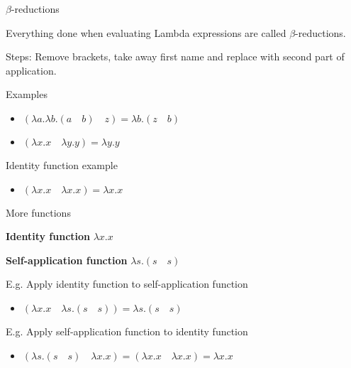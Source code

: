 \documentclass{beamer}
\begin{document}
\begin{frame}{$\beta$-reductions}

Everything done when evaluating Lambda expressions are called $\beta$-reductions.

\vspace{0.5cm}

Steps: Remove brackets, take away first name and replace with second part of application.

\vspace{0.5cm}

\begin{block}{Examples}
  \begin{itemize}
  	\item $(\lambda a . \lambda b . (a \quad b) \quad z) = \lambda b . (z \quad b)$
   	\item $(\lambda x . x \quad \lambda y . y) = \lambda y . y$
  \end{itemize}
\end{block}

\begin{block}{Identity function example}
  \begin{itemize}
    \item $(\lambda x . x \quad \lambda x . x) = \lambda x . x$
  \end{itemize}
\end{block}

\end{frame}

\begin{frame}{More functions}
	\begin{framed}
    	\textbf{Identity function} \hfill $\lambda x . x$
    \end{framed}
    	\begin{framed}
    	\textbf{Self-application function} \hfill $\lambda s . (s \quad s)$
    \end{framed}
    \begin{block}{E.g. Apply identity function to self-application function}
	    \begin{itemize}
    		\item $(\lambda x . x \quad \lambda s . (s \quad s)) = \lambda s. (s \quad s)$
	    \end{itemize}
    \end{block}
    \begin{block}{E.g. Apply self-application function to identity function}
	    \begin{itemize}
    		\item $(\lambda s . (s \quad s) \quad \lambda x . x) = (\lambda x . x \quad \lambda x . x) = \lambda x . x$
	    \end{itemize}
    \end{block}
\end{frame}
\end{document}
